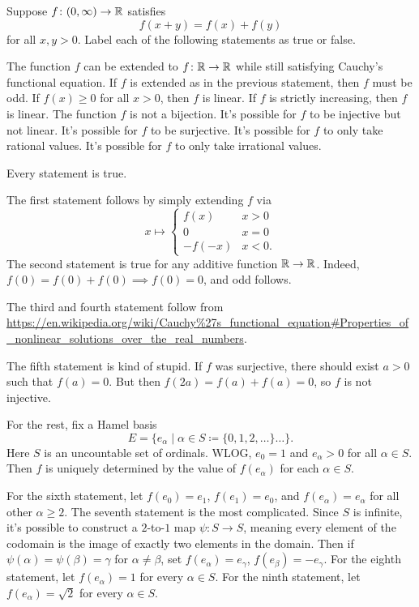 \begin{problem}
	Suppose $f \colon (0,\infty) \to \mathbb R$ satisfies
	\[ f(x+y) = f(x) + f(y) \]
	for all $x,y > 0$.
	Label each of the following statements as true or false.
	\begin{enumerate}
		\ii The function $f$ can be extended to $f \colon \mathbb R \to \mathbb R$
		while still satisfying Cauchy's functional equation.
		\ii If $f$ is extended as in the previous statement, then $f$ must be odd.
		\ii If $f(x) \ge 0$ for all $x > 0$, then $f$ is linear.
		\ii If $f$ is strictly increasing, then $f$ is linear.
		\ii The function $f$ is not a bijection.
		\ii It's possible for $f$ to be injective but not linear.
		\ii It's possible for $f$ to be surjective.
		\ii It's possible for $f$ to only take rational values.
		\ii It's possible for $f$ to only take irrational values.
	\end{enumerate}
	\begin{sol}
	Every statement is true.

	The first statement follows by simply extending $f$ via
	\[
		x \mapsto
		\begin{cases}
			f(x) & x > 0 \\
			0 & x = 0 \\
			-f(-x) & x < 0.
		\end{cases}
	\]
	The second statement is true for any additive function $\mathbb R \to \mathbb R$.
	Indeed, $f(0) = f(0)+f(0) \implies f(0)=0$, and odd follows.

	The third and fourth statement follow from
	\url{https://en.wikipedia.org/wiki/Cauchy\%27s_functional_equation#Properties_of_nonlinear_solutions_over_the_real_numbers}.

	The fifth statement is kind of stupid.
	If $f$ was surjective, there should exist $a > 0$ such that $f(a) = 0$.
	But then $f(2a) = f(a)+f(a) = 0$, so $f$ is not injective.

	For the rest, fix a Hamel basis
	\[ E = \{e_\alpha \mid \alpha \in S \coloneqq \{ 0,1,2,\dots\} \dots \}. \]
	Here $S$ is an uncountable set of ordinals.
	WLOG, $e_0 = 1$ and $e_\alpha > 0$ for all $\alpha \in S$.
	Then $f$ is uniquely determined by the value of $f(e_\alpha)$ for each $\alpha \in S$.
	\begin{itemize}
		\ii For the sixth statement, let $f(e_0) = e_1$, $f(e_1) = e_0$,
		and $f(e_\alpha) = e_\alpha$ for all other $\alpha \ge 2$.
		\ii The seventh statement is the most complicated.
		Since $S$ is infinite, it's possible to construct a $2$-to-$1$ map
		$\psi \colon S \to S$, meaning every element of the codomain
		is the image of exactly two elements in the domain.
		Then if $\psi(\alpha) = \psi(\beta) = \gamma$ for $\alpha \neq \beta$,
		set $f(e_\alpha) = e_\gamma$, $f(e_\beta) = -e_\gamma$.
		\ii For the eighth statement, let $f(e_\alpha) = 1$ for every $\alpha \in S$.
		\ii For the ninth statement, let $f(e_\alpha) = \sqrt 2$ for every $\alpha \in S$.
	\end{itemize}
	\end{sol}
\end{problem}
